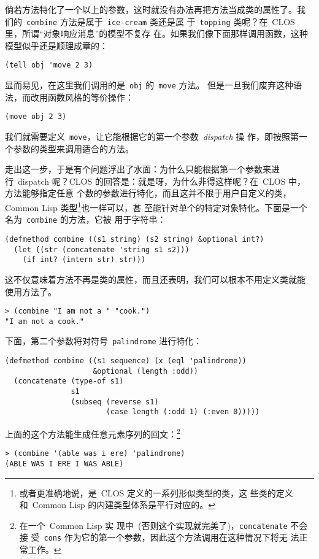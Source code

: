 倘若方法特化了一个以上的参数，这时就没有办法再把方法当成类的属性了。我
们的~\texttt{combine} 方法是属于~\texttt{ice-cream} 类还是属
于~\texttt{topping} 类呢？在~CLOS 里，所谓``对象响应消息''的模型不复存
在。如果我们像下面那样调用函数，这种模型似乎还是顺理成章的：
\begin{lstlisting}
(tell obj 'move 2 3)
\end{lstlisting}
显而易见，在这里我们调用的是~\texttt{obj} 的~\texttt{move} 方法。
但是一旦我们废弃这种语法，而改用函数风格的等价操作：
\begin{lstlisting}
(move obj 2 3)
\end{lstlisting}
我们就需要定义~\texttt{move}，让它能根据它的第一个参数~\emph{dispatch} 操
作，即按照第一个参数的类型来调用适合的方法。

走出这一步，于是有个问题浮出了水面：为什么只能根据第一个参数来进
行~dispatch 呢？CLOS 的回答是：就是呀，为什么非得这样呢？在~CLOS 中，方法能够指定任意
个数的参数进行特化，而且这并不限于用户自定义的类，Common
Lisp 类型\footnote{或者更准确地说，是~CLOS 定义的一系列形似类型的类，这
  些类的定义和~Common Lisp 的内建类型体系是平行对应的。}也一样可以，甚
至能针对单个的特定对象特化。下面是一个名为~\texttt{combine} 的方法，它被
用于字符串：
\begin{lstlisting}
(defmethod combine ((s1 string) (s2 string) &optional int?)
  (let ((str (concatenate 'string s1 s2)))
    (if int? (intern str) str)))
\end{lstlisting}
这不仅意味着方法不再是类的属性，而且还表明，我们可以根本不用定义类就能
使用方法了。
\begin{lstlisting}
> (combine "I am not a " "cook.")
"I am not a cook."
\end{lstlisting}
下面，第二个参数将对符号~\texttt{palindrome} 进行特化：
\begin{lstlisting}
(defmethod combine ((s1 sequence) (x (eql 'palindrome))
                    &optional (length :odd))
  (concatenate (type-of s1)
               s1
               (subseq (reverse s1)
                       (case length (:odd 1) (:even 0)))))
\end{lstlisting}
上面的这个方法能生成任意元素序列的回文：\footnote{在一个~Common Lisp 实
  现中~(否则这个实现就完美了)，\texttt{concatenate} 不会接
  受~\texttt{cons} 作为它的第一个参数，因此这个方法调用在这种情况下将无
  法正常工作。}
\begin{lstlisting}
> (combine '(able was i ere) 'palindrome)
(ABLE WAS I ERE I WAS ABLE)
\end{lstlisting}


